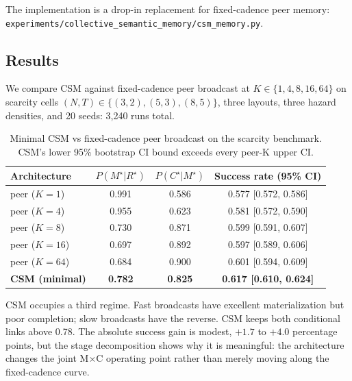 \documentclass{article}
\newcommand{\method}[1]{\texttt{#1}}
\begin{document}
The implementation is a drop-in replacement for fixed-cadence peer
memory: \method{experiments/collective\_semantic\_memory/csm\_memory.py}.

\subsection{Results}

We compare CSM against fixed-cadence peer broadcast at
$K \in \{1,4,8,16,64\}$ on scarcity cells
$(N,T){\in}\{(3,2),(5,3),(8,5)\}$, three layouts, three hazard
densities, and 20 seeds: 3{,}240 runs total.

\begin{table}[ht]
\caption{Minimal CSM vs fixed-cadence peer broadcast on the scarcity benchmark. CSM's lower 95\% bootstrap CI bound exceeds every peer-K upper CI.}
\label{tab:csm-results}
\centering
\small
\begin{tabular}{l c c c}
\toprule
Architecture & $P(M^\star|R^\star)$ & $P(C^\star|M^\star)$ & Success rate (95\% CI) \\
\midrule
peer ($K{=}1$)  & 0.991 & 0.586 & 0.577 [0.572, 0.586] \\
peer ($K{=}4$)  & 0.955 & 0.623 & 0.581 [0.572, 0.590] \\
peer ($K{=}8$)  & 0.730 & 0.871 & 0.599 [0.591, 0.607] \\
peer ($K{=}16$) & 0.697 & 0.892 & 0.597 [0.589, 0.606] \\
peer ($K{=}64$) & 0.684 & 0.900 & 0.601 [0.594, 0.609] \\
\textbf{CSM (minimal)} & \textbf{0.782} & \textbf{0.825} & \textbf{0.617 [0.610, 0.624]} \\
\bottomrule
\end{tabular}
\end{table}

CSM occupies a third regime. Fast broadcasts have excellent
materialization but poor completion; slow broadcasts have the reverse.
CSM keeps both conditional links above 0.78. The absolute success gain
is modest, $+1.7$ to $+4.0$ percentage points, but the stage
decomposition shows why it is meaningful: the architecture changes the
joint M$\times$C operating point rather than merely moving along the
fixed-cadence curve.
\end{document}
